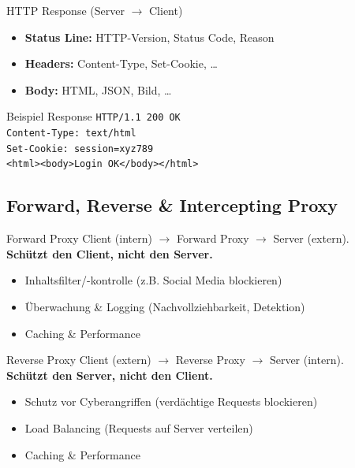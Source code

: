 \documentclass[a4paper, fontsize=7pt]{scrartcl}
\begin{document}
\begin{mainbox}{HTTP Response (Server $\to$ Client)}
\begin{itemize}
    \item \textbf{Status Line:} HTTP-Version, Status Code, Reason
    \item \textbf{Headers:} Content-Type, Set-Cookie, \ldots
    \item \textbf{Body:} HTML, JSON, Bild, \ldots
\end{itemize}
\end{mainbox}

\begin{subbox}{Beispiel Response}
\texttt{HTTP/1.1 200 OK}\\
\texttt{Content-Type: text/html}\\
\texttt{Set-Cookie: session=xyz789}\\[2pt]
\texttt{<html><body>Login OK</body></html>}
\end{subbox}

\subsection{Forward, Reverse \& Intercepting Proxy}

\begin{mainbox}{Forward Proxy}
Client (intern) $\to$ Forward Proxy $\to$ Server (extern).\\
\textbf{Schützt den Client, nicht den Server.}
\begin{itemize}
    \item Inhaltsfilter/-kontrolle (z.B. Social Media blockieren)
    \item Überwachung \& Logging (Nachvollziehbarkeit, Detektion)
    \item Caching \& Performance
\end{itemize}
\end{mainbox}

\begin{mainbox}{Reverse Proxy}
Client (extern) $\to$ Reverse Proxy $\to$ Server (intern).\\
\textbf{Schützt den Server, nicht den Client.}
\begin{itemize}
    \item Schutz vor Cyberangriffen (verdächtige Requests blockieren)
    \item Load Balancing (Requests auf Server verteilen)
    \item Caching \& Performance
\end{itemize}
\end{mainbox}
\end{document}

